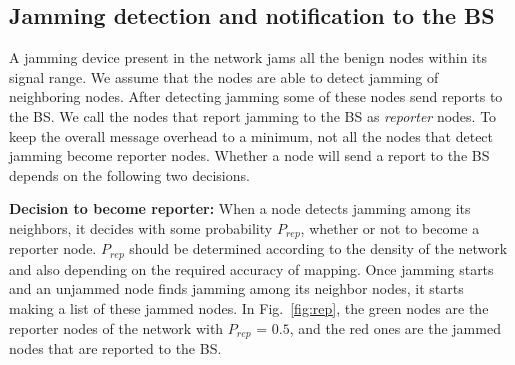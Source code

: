 \documentclass[conference]{IEEEtran}
\begin{document}
\subsection{Jamming detection and notification to the BS}\label{detect}
A jamming device present in the network jams all the benign nodes within its signal range. We assume that the nodes are able to detect jamming of neighboring nodes. After detecting jamming some of these nodes send reports to the BS. We call the nodes that report jamming to the BS as {\em reporter} nodes. To keep the overall message overhead to a minimum, not all the nodes that detect jamming become reporter nodes. Whether a node will send a report to the BS depends on the following two decisions.
\begin{list}{}{\leftmargin=1em}
\item
{\bf Decision to become reporter:} When a node detects jamming among its neighbors, it decides with some probability $P_{rep}$, whether or not to become a reporter node. $P_{rep}$ should be determined according to the density of the network and also depending on the required accuracy of mapping. Once jamming starts and an unjammed node finds jamming among its neighbor nodes, it starts making a list of these jammed nodes. In Fig.~\ref{fig:rep}, the green nodes are the reporter nodes of the network with $P_{rep}$ = $0.5$, and the red ones are the jammed nodes that are reported to the BS.


\end{list}
\end{document}
